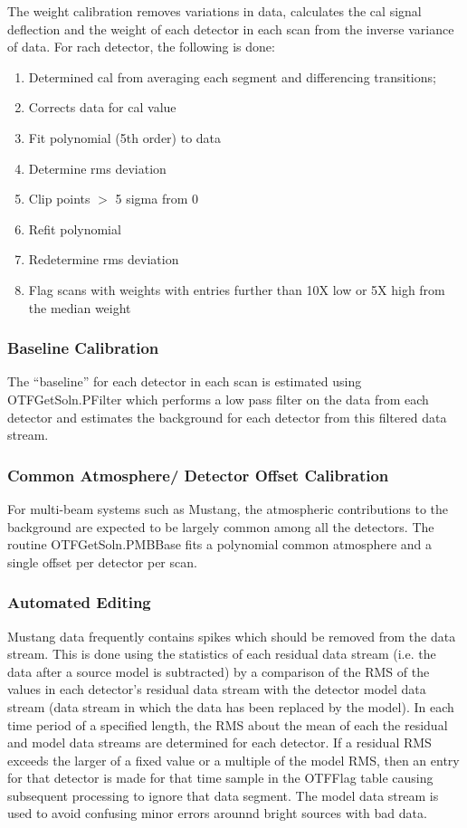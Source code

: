 \documentclass[11pt]{report}
\begin{document}
   The weight calibration removes variations in data, calculates the
cal signal deflection and the weight of each detector in each scan
from the inverse variance of data.
For rach detector, the following is done:
\begin{enumerate}
\item Determined cal from averaging each segment and differencing transitions;
\item Corrects data for cal value
\item Fit polynomial (5th order) to data
\item Determine rms deviation
\item Clip points $>$ 5 sigma from 0
\item Refit polynomial
\item Redetermine rms deviation
\item Flag scans with weights with entries further than 10X low or
5X high from the median weight
\end{enumerate}
  

\subsubsection{Baseline Calibration}
The ``baseline'' for each detector in each scan is estimated using 
OTFGetSoln.PFilter which performs a low pass filter on the data from
each detector and estimates the background for each detector from this
filtered data stream.

\subsubsection{Common Atmosphere/ Detector Offset Calibration}
For multi-beam systems such as Mustang, the atmospheric contributions
to the background are expected to be largely common among all the
detectors.
The routine OTFGetSoln.PMBBase fits a polynomial common atmosphere and
a single  offset per detector per scan.

\subsubsection{Automated Editing\label{autoFlag}}
Mustang data frequently contains spikes which should be removed from
the data stream.
This is done using the statistics of each residual data stream (i.e.
the data after a source model is subtracted) by a comparison of the
RMS of the values in each detector's residual data stream with the
detector model data stream (data stream in which the data has been
replaced by the model).
In each time period of a specified length, the RMS about the mean of
each the residual and model data streams are determined for each
detector. 
If a residual RMS exceeds the larger of a fixed value or a multiple of
the model RMS, then an entry for that detector is made for that time
sample in the OTFFlag table causing subsequent processing to ignore
that data segment.
The model data stream is used to avoid confusing minor errors arounnd
bright sources with bad data.
\end{document}

